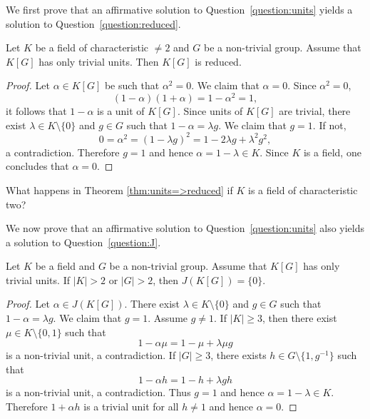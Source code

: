 We first prove that an affirmative solution to Question~\ref{question:units} 
yields a solution to Question~\ref{question:reduced}. 

\begin{theorem}
\label{thm:units=>reduced}
    Let $K$ be a field of characteristic $\ne2$ 
	and $G$ be a non-trivial group. Assume that $K[G]$ has only trivial units.
	Then $K[G]$ is reduced. 
\end{theorem}

\begin{proof}
	Let $\alpha\in K[G]$ be such that $\alpha^2=0$. We claim that 
	$\alpha=0$. Since $\alpha^2=0$, 
	\[
		(1-\alpha)(1+\alpha)=1-\alpha^2=1, 
	\]
	it follows that $1-\alpha$ is a unit of $K[G]$. Since units of $K[G]$ are 
	trivial, there exist $\lambda\in K\setminus\{0\}$ and $g\in G$ such that 
	$1-\alpha=\lambda g$. We claim that $g=1$. If not, 
	\[
		0=\alpha^2=(1-\lambda g)^2=1-2\lambda g+\lambda^2g^2,
	\]
	a contradiction. Therefore $g=1$ and hence $\alpha=1-\lambda\in K$. Since
	$K$ is a field, one concludes that $\alpha=0$.
\end{proof}

\begin{exercise}
    What happens in Theorem \ref{thm:units=>reduced} if $K$ is a field of characteristic two?
\end{exercise}

We now prove that an affirmative solution to Question~\ref{question:units} 
also yields a solution to Question~\ref{question:J}. 

\begin{theorem}
	Let $K$ be a field and $G$ be a non-trivial group. Assume that $K[G]$ has only trivial units. 
	If $|K|>2$ or $|G|>2$, then $J(K[G])=\{0\}$.
\end{theorem}

\begin{proof}
	Let $\alpha\in J(K[G])$. There exist $\lambda\in K\setminus\{0\}$ and $g\in
	G$ such that $1-\alpha=\lambda g$. We claim that $g=1$. Assume $g\ne 1$. 
	If $|K|\geq3$,
	then there exist $\mu\in K\setminus\{0,1\}$ such that
	\[
		1-\alpha\mu=1-\mu+\lambda\mu g 
	\]
	is a non-trivial unit, a contradiction.
	If $|G|\geq3$, there exists $h\in G\setminus\{1,g^{-1}\}$ such that
	\[
        1-\alpha h=1-h+\lambda gh
    \]
    is a non-trivial unit, a contradiction.  Thus
	$g=1$ and hence $\alpha=1-\lambda\in K$. Therefore $1+\alpha h$ is a
	trivial unit for all $h\ne 1$ and hence 	$\alpha=0$.
\end{proof}

